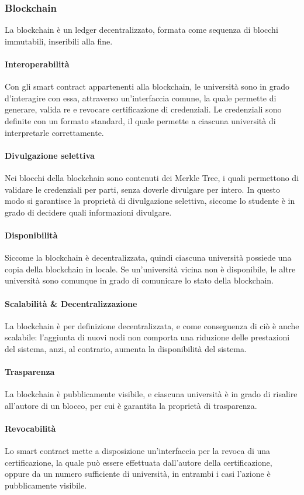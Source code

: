 \documentclass[a4paper,12pt]{article}
\begin{document}
\subsubsection{Blockchain}
La blockchain è un ledger decentralizzato, formata come sequenza di blocchi immutabili, inseribili alla fine.
\paragraph{Interoperabilità} 
Con gli smart contract appartenenti alla blockchain, le università sono in grado d'interagire con essa, attraverso un'interfaccia comune, la quale permette di generare, valida re e revocare certificazione di credenziali. 
Le credenziali sono definite con un formato standard, il quale permette a ciascuna università di interpretarle correttamente.
\paragraph{Divulgazione selettiva}
Nei blocchi della blockchain sono contenuti dei Merkle Tree, i quali permettono di validare le credenziali per parti, senza doverle divulgare per intero. In questo modo si garantisce la proprietà di divulgazione selettiva, siccome lo studente è in grado di decidere quali informazioni divulgare.
\paragraph{Disponibilità }
Siccome la blockchain è decentralizzata, quindi ciascuna università possiede una copia della blockchain in locale. Se un'università vicina non è disponibile, le altre università sono comunque in grado di comunicare lo stato della blockchain.
\paragraph{Scalabilità \& Decentralizzazione}
La blockchain è per definizione decentralizzata, e come conseguenza di ciò è anche scalabile: l'aggiunta di nuovi nodi non comporta una riduzione delle prestazioni del sistema, anzi, al contrario, aumenta la disponibilità del sistema. 
\paragraph{Trasparenza}
La blockchain è pubblicamente visibile, e ciascuna università è in grado di risalire all'autore di un blocco, per cui è garantita la proprietà di trasparenza.
\paragraph{Revocabilità}
Lo smart contract mette a disposizione un'interfaccia per la revoca di una certificazione, la quale può essere effettuata dall'autore della certificazione, oppure da un numero sufficiente di università, in entrambi i casi l'azione è pubblicamente visibile.
\end{document}
